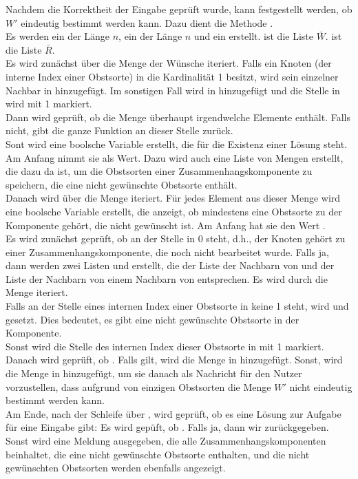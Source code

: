 Nachdem die Korrektheit der Eingabe geprüft wurde, kann festgestellt werden, ob $W'$ eindeutig
bestimmt werden kann. Dazu dient die Methode .\\
Es werden ein  der Länge $n$, ein  der Länge $n$ und 
ein  erstellt.
 ist die Liste $\bar{W}$.  ist die Liste $\bar{R}$.\\
Es wird zunächst über die Menge der Wünsche  iteriert. 
Falls ein Knoten  (der interne Index einer Obstsorte) in 
die Kardinalität 1 besitzt, wird sein einzelner
Nachbar in  hinzugefügt.
Im sonstigen Fall wird  in  hinzugefügt und die Stelle  in 
wird mit 1 markiert.\\
Dann wird geprüft, ob die Menge  überhaupt irgendwelche Elemente enthält.
Falls nicht, gibt die ganze Funktion an dieser Stelle  zurück.\\
Sont wird eine boolsche Variable  erstellt, die für die Existenz einer Lösung steht.
Am Anfang nimmt sie  als Wert. 
Dazu wird auch eine Liste von Mengen  erstellt, die dazu da ist, um
die Obstsorten einer Zusammenhangskomponente zu speichern, die eine nicht gewünschte Obstsorte enthält.\\
Danach wird über die Menge  iteriert. 
Für jedes Element  aus dieser Menge wird eine boolsche Variable  erstellt, die 
anzeigt, ob mindestens eine Obstsorte zu der Komponente gehört, die nicht gewünscht ist.
Am Anfang hat sie den Wert .\\
Es wird zunächst geprüft, ob an der Stelle  in  0 steht, d.h.,
der Knoten gehört zu einer Zusammenhangskomponente, die noch nicht bearbeitet wurde.
Falls ja, dann werden zwei Listen  und  erstellt,
die der Liste der Nachbarn von  und der Liste der Nachbarn von einem Nachbarn von 
entsprechen.
Es wird durch die Menge  iteriert.\\
Falls an der Stelle eines internen Index
einer Obstsorte in  keine 1 steht, wird  und  gesetzt.
Dies bedeutet, es gibt eine nicht gewünschte Obstsorte in der Komponente.\\
Sonst wird die Stelle des internen Index dieser Obstsorte in  mit 1 markiert.\\
Danach wird geprüft, ob . Falls  gilt, wird die Menge 
in  hinzugefügt. Sonst, wird die Menge  in  hinzugefügt, um sie 
danach als Nachricht für den Nutzer vorzustellen, dass aufgrund von einzigen Obstsorten 
die Menge $W'$ nicht eindeutig bestimmt werden kann.\\
Am Ende, nach der Schleife über , wird geprüft, ob es eine Lösung zur Aufgabe für eine
Eingabe gibt: Es wird gepüft, ob . Falls ja, dann wir  zurückgegeben.
Sonst wird eine Meldung ausgegeben, die alle Zusammenhangskomponenten beinhaltet, 
die eine nicht gewünschte Obstsorte enthalten, und die nicht gewünschten Obstsorten werden
ebenfalls angezeigt.
